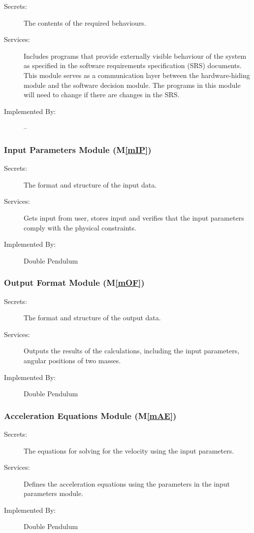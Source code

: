 \documentclass[12pt, titlepage]{article}
\newcommand{\mref}[1]{M\ref{#1}}
\begin{document}
\begin{description}
\item[Secrets:]The contents of the required behaviours.
\item[Services:]Includes programs that provide externally visible behaviour of
  the system as specified in the software requirements specification (SRS)
  documents. This module serves as a communication layer between the
  hardware-hiding module and the software decision module. The programs in this
  module will need to change if there are changes in the SRS.
\item[Implemented By:] --
\end{description}

\subsubsection{Input Parameters Module (\mref{mIP})}

\begin{description}
\item[Secrets:]The format and structure of the input data.
\item[Services:]Gets input from user, stores input and verifies that the input
  parameters comply with the physical constraints.
\item[Implemented By:] Double Pendulum
\end{description}

\subsubsection{Output Format Module (\mref{mOF})}

\begin{description}
\item[Secrets:]The format and structure of the output data.
\item[Services:]Outputs the results of the calculations, including the input
  parameters, angular positions of two masses.
\item[Implemented By:] Double Pendulum
\end{description}

\subsubsection{Acceleration Equations Module (\mref{mAE})}

\begin{description}
\item[Secrets:]The equations for solving for the velocity using the input
  parameters.
\item[Services:]Defines the acceleration equations using the parameters in the
  input parameters module.
\item[Implemented By:] Double Pendulum
\end{description}
\end{document}
